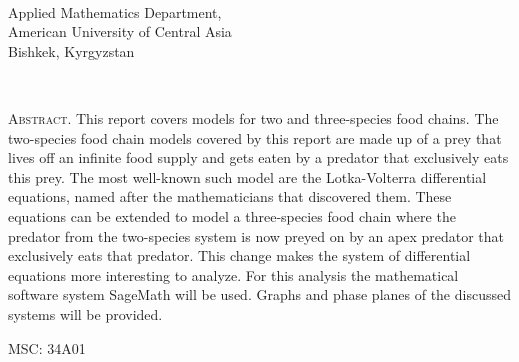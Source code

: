 \documentclass[12pt,a4paper,reqno]{amsart}
\renewcommand{\baselinestretch}{1.5}
\begin{document}
\begin{titlepage}
    \begin{center}
        \vspace*{1cm}
        \Huge
        \textbf{\heading{}\\}
        \vspace{0.5cm}
        \vspace{1.5cm}
        \LARGE
        \textbf{\name{}}
        \vfill
        \vspace{0.3cm}
        \Large
        Applied Mathematics Department,\\
        American University of Central Asia\\
        Bishkek, Kyrgyzstan\\
        \datum{}
    \end{center}
\end{titlepage}

\thispagestyle{plain}
\begin{center}
    \Large
    \textbf{\heading{}}\\
    \vspace{0.4cm}
    \large
    \textbf{\name{}}
    \vspace{0.6cm}
\end{center}
\textsc{Abstract.} This report covers models for two and three-species food
chains. The two-species food chain models covered by this report are made up of
a prey that lives off an infinite food supply and gets eaten by a predator that
exclusively eats this prey. The most well-known such model are the
Lotka-Volterra differential equations, named after the mathematicians that
discovered them. These equations can be extended to model a three-species food
chain where the predator from the two-species system is now preyed on by an
apex predator that exclusively eats that predator. This change makes the system
of differential equations more interesting to analyze. For this analysis the
mathematical software system SageMath will be used. Graphs and phase planes of
the discussed systems will be provided.

MSC: \textsc{34A01}

\vspace{-0.2\baselineskip}
\renewcommand{\baselinestretch}{1}
\tableofcontents
\renewcommand{\baselinestretch}{1.5}

\pagestyle{fancy}
\renewcommand{\headrulewidth}{0pt}
\fancyhead{}
\fancyhead[CE]{\textsc{\name{}}}
\fancyhead[CO]{\textsc{\heading{}}}
\newpage

\end{document}
